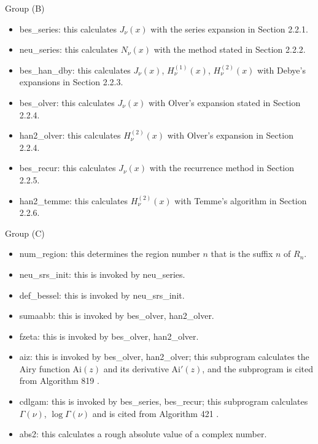 \documentclass[acmtoms]{acmtrans2m}
\begin{document}
Group (B)
\begin{itemize}
\item 
bes\_series: this calculates $J_\nu(x)$ with the series expansion in Section 
2.2.1.
\item 
neu\_series: this calculates $N_\nu(x)$ with the method stated in Section 
2.2.2.
\item 
bes\_han\_dby: this calculates $J_\nu(x)$, $H_\nu^{(1)}\!(x)$, 
$H_\nu^{(2)}\!(x)$ with Debye's expansions in Section 2.2.3.
\item 
bes\_olver: this calculates $J_\nu(x)$ with Olver's expansion stated in 
Section 2.2.4.
\item 
han2\_olver: this calculates $H_\nu^{(2)}\!(x)$ with Olver's expansion in 
Section 2.2.4.
\item 
bes\_recur: this calculates $J_\nu(x)$ with the recurrence method in Section 
2.2.5.
\item 
han2\_temme: this calculates $H_\nu^{(2)}\!(x)$ with Temme's algorithm
in Section 2.2.6.
\end{itemize}
Group (C)
\begin{itemize}
\item 
num\_region: this determines the region number $n$ that is the suffix $n$ of 
$R_n$.
\item 
neu\_srs\_init: this is invoked by neu\_series.
\item 
def\_bessel: this is invoked by neu\_srs\_init.
\item 
sumaabb: this is invoked by bes\_olver, han2\_olver.
\item 
fzeta: this is invoked by bes\_olver, han2\_olver.
\item aiz: 
this is invoked by bes\_olver, han2\_olver;
this subprogram calculates the Airy function Ai$(z)$ and its 
derivative Ai$'(z)$, and the subprogram is cited from Algorithm 819 \cite{gil}.
\item cdlgam: 
this is invoked by bes\_series, bes\_recur;
this subprogram calculates $\Gamma(\nu)$, $\log\Gamma(\nu)$
and is cited from Algorithm 421 \cite{kuki72b}. 
\item 
abs2: this calculates a rough absolute value of a complex number.
\end{itemize}
\end{document}
